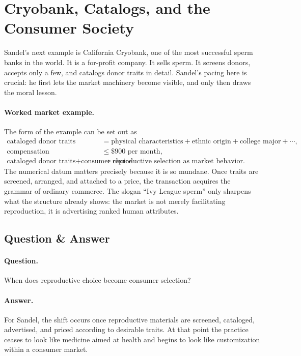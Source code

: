 \section{Cryobank, Catalogs, and the Consumer Society}

Sandel's next example is California Cryobank, one of the most successful sperm banks in the world. It is a for-profit company. It sells sperm. It screens donors, accepts only a few, and catalogs donor traits in detail. Sandel's pacing here is crucial: he first lets the market machinery become visible, and only then draws the moral lesson.

\paragraph{Worked market example.} The form of the example can be set out as
\begin{align}
\text{cataloged donor traits}
&=
\text{physical characteristics}
+
\text{ethnic origin}
+
\text{college major}
+\cdots,\\
\text{compensation}
&\leq
\$900 \text{ per month},\\
\text{cataloged donor traits}
+
\text{consumer choice}
&\Longrightarrow
\text{reproductive selection as market behavior}.
\end{align}
The numerical datum matters precisely because it is so mundane. Once traits are screened, arranged, and attached to a price, the transaction acquires the grammar of ordinary commerce. The slogan ``Ivy League sperm'' only sharpens what the structure already shows: the market is not merely facilitating reproduction, it is advertising ranked human attributes.

\subsection{Question \& Answer}

\paragraph{Question.} When does reproductive choice become consumer selection?

\paragraph{Answer.} For Sandel, the shift occurs once reproductive materials are screened, cataloged, advertised, and priced according to desirable traits. At that point the practice ceases to look like medicine aimed at health and begins to look like customization within a consumer market.

